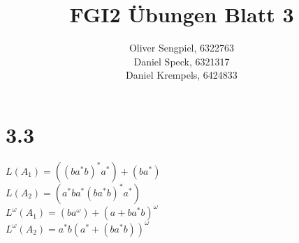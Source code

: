 \documentclass{article}
\title{FGI2 Übungen Blatt 3}
\author{Oliver Sengpiel, 6322763 \\ Daniel Speck, 6321317 \\ Daniel
Krempels, 6424833}
\begin{document}
\maketitle

\section*{3.3}
$L(A_1) = ((ba^*b)^*a^*) + (ba^*)$ \\
$L(A_2) = (a^*ba^*(ba^*b)^*a^*)$ \\
$L^\omega(A_1) = (ba^\omega) + (a + ba^*b)^\omega$ \\
$L^\omega(A_2) = a^*b(a^* + (ba^*b))^\omega$ \\
\end{document}
